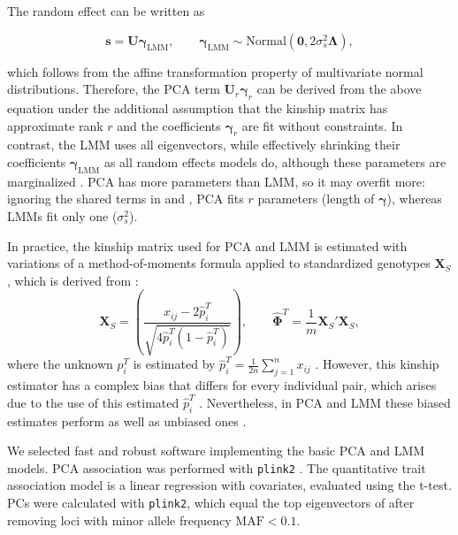 \documentclass[9pt,lineno]{elife}
\newcommand{\xij}[1][j]{x_{i#1}}
\newcommand{\pit}{p_i^T}
\newcommand{\pith}{\hat{p}_i^T}
\begin{document}
The random effect can be written as
\begin{linenomath*}
  $$
  \mathbf{s} = \mathbf{U} \boldsymbol{\gamma}_\text{LMM},
  \quad\quad
  \boldsymbol{\gamma}_\text{LMM}
  \sim \text{Normal}( \mathbf{0}, 2 \sigma_s^2 \boldsymbol{\Lambda})
  ,
  $$
\end{linenomath*}
which follows from the affine transformation property of multivariate normal distributions.
Therefore, the PCA term $\mathbf{U}_r \boldsymbol{\gamma}_r$ can be derived from the above equation under the additional assumption that the kinship matrix has approximate rank $r$ and the coefficients $\boldsymbol{\gamma}_r$ are fit without constraints.
In contrast, the LMM uses all eigenvectors, while effectively shrinking their coefficients $\boldsymbol{\gamma}_\text{LMM}$ as all random effects models do, although these parameters are marginalized \citep{astle_population_2009, janss_inferences_2012, hoffman_correcting_2013, zhang_principal_2015}.
PCA has more parameters than LMM, so it may overfit more: ignoring the shared terms in  and , PCA fits $r$ parameters (length of $\boldsymbol{\gamma}$), whereas LMMs fit only one ($\sigma^2_s$).

In practice, the kinship matrix used for PCA and LMM is estimated with variations of a method-of-moments formula applied to standardized genotypes $\mathbf{X}_S$, which is derived from :
\begin{equation}
  \label{eq:kinship_std}
  \mathbf{X}_S
  =
  \left(
    \frac{
      \xij - 2 \pith
    }{
      \sqrt{4 \pith \left( 1 - \pith \right)}
    }
  \right)
  ,
  \quad\quad
  \mathbf{\hat{\Phi}}^T
  =
  \frac{1}{m}
  \mathbf{X}_S'
  \mathbf{X}_S
  ,
\end{equation}
where the unknown $\pit$ is estimated by
$
\pith = \frac{1}{2n} \sum_{j = 1}^n \xij
$
\citep{price_principal_2006, kang_efficient_2008, kang_variance_2010, yang_gcta:_2011, zhou_genome-wide_2012, yang_advantages_2014, loh_efficient_2015, sul_population_2018, zhou_efficiently_2018}.
However, this kinship estimator has a complex bias that differs for every individual pair, which arises due to the use of this estimated $\pith$ \citep{ochoa_estimating_2021, ochoa_new_2019}.
Nevertheless, in PCA and LMM these biased estimates perform as well as unbiased ones \citep{hou_genetic_2023}.

We selected fast and robust software implementing the basic PCA and LMM models.
PCA association was performed with \texttt{plink2} \citep{chang_second-generation_2015}.
The quantitative trait association model is a linear regression with covariates, evaluated using the t-test.
PCs were calculated with \texttt{plink2}, which equal the top eigenvectors of  after removing loci with minor allele frequency $\text{MAF} < 0.1$.
\end{document}
